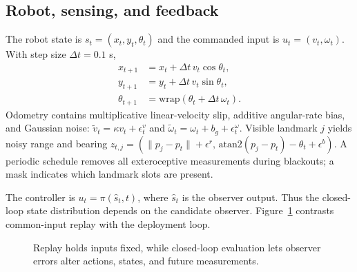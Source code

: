 \documentclass{article}
\begin{document}
\subsection{Robot, sensing, and feedback}
The robot state is $s_t=(x_t,y_t,\theta_t)$ and the commanded input is $u_t=(v_t,\omega_t)$. With step size $\Delta t=0.1$ s,
\begin{equation}
\begin{aligned}
x_{t+1}&=x_t+\Delta t\,v_t\cos\theta_t,\\
y_{t+1}&=y_t+\Delta t\,v_t\sin\theta_t,\\
\theta_{t+1}&=\mathrm{wrap}(\theta_t+\Delta t\,\omega_t).
\end{aligned}
\end{equation}
Odometry contains multiplicative linear-velocity slip, additive angular-rate bias, and Gaussian noise:
$\tilde v_t=\kappa v_t+\epsilon^v_t$ and $\tilde\omega_t=\omega_t+b_g+\epsilon^\omega_t$.
Visible landmark $j$ yields noisy range and bearing
$z_{t,j}=(\|p_j-p_t\|+\epsilon^r,\,\mathrm{atan2}(p_j-p_t)-\theta_t+\epsilon^b)$.
A periodic schedule removes all exteroceptive measurements during blackouts; a mask indicates which landmark slots are present.

The controller is $u_t=\pi(\hat s_t,t)$, where $\hat s_t$ is the observer output. Thus the closed-loop state distribution depends on the candidate observer. Figure~\ref{fig:protocol} contrasts common-input replay with the deployment loop.

\begin{figure}[t]
\centering
{}
\caption{Replay holds inputs fixed, while closed-loop evaluation lets observer errors alter actions, states, and future measurements.}
\label{fig:protocol}
\end{figure}
\end{document}
